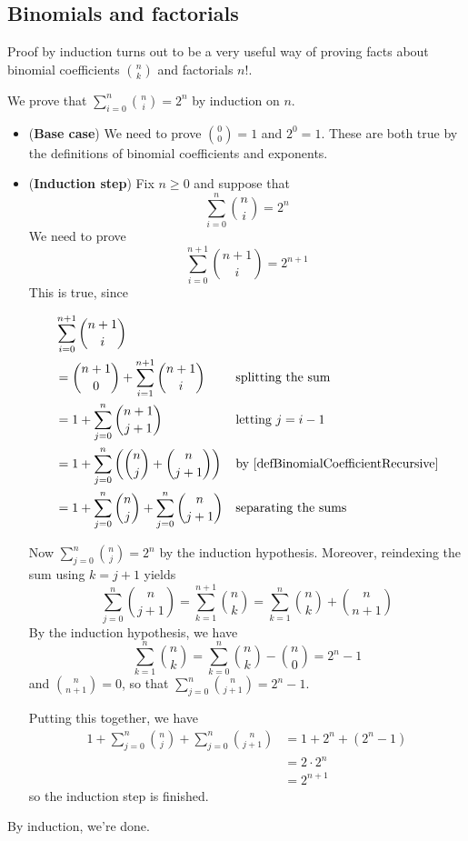 \subsection*{Binomials and factorials}

Proof by induction turns out to be a very useful way of proving facts about binomial coefficients $\binom{n}{k}$ and factorials $n!$.

\begin{example}
\label{exSumOfBinomialCoefficients}
We prove that $\sum_{i=0}^n \binom{n}{i} = 2^n$ by induction on $n$.
\begin{itemize}
\item (\textbf{Base case}) We need to prove $\binom{0}{0} = 1$ and $2^0=1$. These are both true by the definitions of binomial coefficients and exponents.
\item (\textbf{Induction step}) Fix $n \ge 0$ and suppose that
\[ \sum_{i=0}^n \binom{n}{i} = 2^n \]
We need to prove
\[ \sum_{i=0}^{n+1} \binom{n+1}{i} = 2^{n+1} \]
This is true, since

\begin{align*}
&\sum_{i=0}^{n+1} \binom{n+1}{i} && \\
&= \binom{n+1}{0} + \sum_{i=1}^{n+1} \binom{n+1}{i} && \text{splitting the sum} \\
&= 1 + \sum_{j=0}^n \binom{n+1}{j+1} && \text{letting $j=i-1$} \\
&= 1 + \sum_{j=0}^n \left(\binom{n}{j} + \binom{n}{j+1}\right) && \text{by \Cref{defBinomialCoefficientRecursive}} \\
&= 1 + \sum_{j=0}^n \binom{n}{j} + \sum_{j=0}^n \binom{n}{j+1} && \text{separating the sums}
\end{align*}

Now $\sum_{j=0}^n \binom{n}{j} = 2^n$ by the induction hypothesis. Moreover, reindexing the sum using $k=j+1$ yields
\[ \sum_{j=0}^n \binom{n}{j+1} = \sum_{k=1}^{n+1} \binom{n}{k} = \sum_{k=1}^n \binom{n}{k} + \binom{n}{n+1} \]
By the induction hypothesis, we have
\[ \sum_{k=1}^n \binom{n}{k} = \sum_{k=0}^n \binom{n}{k} - \binom{n}{0} = 2^n-1 \]
and $\binom{n}{n+1} = 0$, so that $\sum_{j=0}^n \binom{n}{j+1} = 2^n-1$.

Putting this together, we have
\begin{align*}
1 + \sum_{j=0}^n \binom{n}{j} + \sum_{j=0}^n \binom{n}{j+1}
&= 1 + 2^n + (2^n-1) \\
&= 2 \cdot 2^n \\
&= 2^{n+1}
\end{align*}
so the induction step is finished.
\end{itemize}
By induction, we're done.
\end{example}

